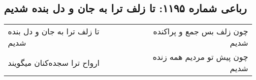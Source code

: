 \begin{center}
\section*{رباعی شماره ۱۱۹۵: تا زلف ترا به جان و دل بنده شدیم}
\label{sec:1195}
\begin{longtable}{l p{0.5cm} r}
تا زلف ترا به جان و دل بنده شدیم
&&
چون زلف بس جمع و پراکنده شدیم
\\
ارواح ترا سجده‌کنان میگویند
&&
چون پیش تو مردیم همه زنده شدیم
\\
\end{longtable}
\end{center}
